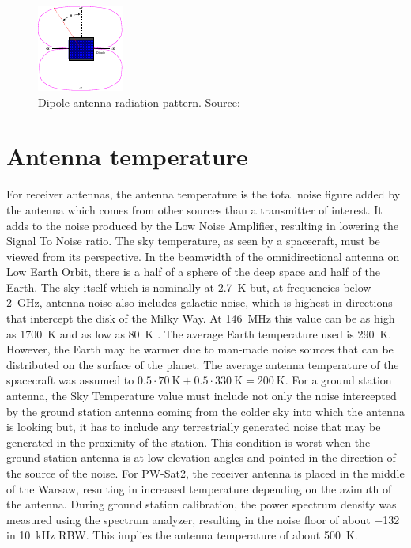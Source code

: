 \begin{figure}
    \centering
    \includegraphics[width=0.4\paperwidth]{img/8/dipole_pattern.pdf}
    \caption{Dipole antenna radiation pattern. Source: \cite{amsat_link_budget}}
    \label{link:dipole_pattern}
\end{figure}


\section{Antenna temperature}
For receiver antennas, the antenna temperature is the total noise figure added by the antenna which comes from other sources than a transmitter of interest. It adds to the noise produced by the Low Noise Amplifier, resulting in lowering the Signal To Noise ratio.
The sky temperature, as seen by a spacecraft, must be viewed from its perspective. In the beamwidth of the omnidirectional antenna on Low Earth Orbit, there is a half of a sphere of the deep space and half of the Earth. The sky itself which is nominally at \SI{2.7}{\kelvin} but, at frequencies below \SI{2}{\GHz}, antenna noise also includes galactic noise, which is highest in directions that intercept the disk of the Milky Way.  At \SI{146}{\MHz} this value can be as high as \SI{1700}{\kelvin} and as low as \SI{80}{\kelvin} \cite{amsat_link_budget}. The average Earth temperature used is \SI{290}{\kelvin}. However, the Earth may be warmer due to man-made noise sources that can be distributed on the surface of the planet. The average antenna temperature of the spacecraft was assumed to $0.5 \cdot \SI{70}{\kelvin} + 0.5 \cdot \SI{330}{\kelvin} = \SI{200}{\kelvin}$.
For a ground station antenna, the Sky Temperature value must include not only the noise intercepted by the ground station antenna coming from the colder sky into which the antenna is looking but, it has to include any terrestrially generated noise that may be generated in the proximity of the station. This condition is worst when the ground station antenna is at low elevation angles and pointed in the direction of the source of the noise. For PW-Sat2, the receiver antenna is placed in the middle of the Warsaw, resulting in increased temperature depending on the azimuth of the antenna. During ground station calibration, the power spectrum density was measured using the spectrum analyzer, resulting in the noise floor of about \SI{-132}{\dBm} in \SI{10}{\kHz} RBW. This implies the antenna temperature of about \SI{500}{\kelvin}.


